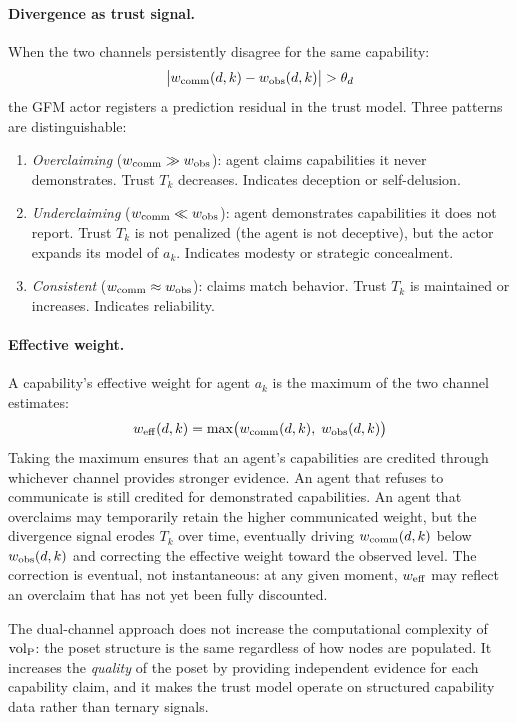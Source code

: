 \paragraph{Divergence as trust signal.} When the two channels persistently
disagree for the same capability:
\begin{equation}
\label{eq:divergence}
\bigl|w_{\mathrm{comm}}(d, k) - w_{\mathrm{obs}}(d, k)\bigr| > \theta_d
\end{equation}
the GFM actor registers a prediction residual in the trust model. Three
patterns are distinguishable:

\begin{enumerate}
\item \emph{Overclaiming} ($w_{\mathrm{comm}} \gg w_{\mathrm{obs}}$): agent claims capabilities it
  never demonstrates. Trust $T_k$ decreases. Indicates deception or
  self-delusion.
\item \emph{Underclaiming} ($w_{\mathrm{comm}} \ll w_{\mathrm{obs}}$): agent demonstrates
  capabilities it does not report. Trust $T_k$ is not penalized (the agent is
  not deceptive), but the actor expands its model of $a_k$. Indicates modesty
  or strategic concealment.
\item \emph{Consistent} ($w_{\mathrm{comm}} \approx w_{\mathrm{obs}}$): claims match behavior.
  Trust $T_k$ is maintained or increases. Indicates reliability.
\end{enumerate}

\paragraph{Effective weight.} A capability's effective weight for agent $a_k$
is the maximum of the two channel estimates:
\begin{equation}
\label{eq:w_eff}
w_{\mathrm{eff}}(d, k) = \max\bigl(w_{\mathrm{comm}}(d, k),\; w_{\mathrm{obs}}(d, k)\bigr)
\end{equation}
Taking the maximum ensures that an agent's capabilities are credited through
whichever channel provides stronger evidence. An agent that refuses to
communicate is still credited for demonstrated capabilities. An agent that
overclaims may temporarily retain the higher communicated weight, but the
divergence signal erodes $T_k$ over time, eventually driving $w_{\mathrm{comm}}(d, k)$
below $w_{\mathrm{obs}}(d, k)$ and correcting the effective weight toward the observed
level. The correction is eventual, not instantaneous: at any given moment,
$w_{\mathrm{eff}}$ may reflect an overclaim that has not yet been fully discounted.

The dual-channel approach does not increase the computational complexity of
${\operatorname{vol}_{\mathrm{P}}}$: the poset structure is the same regardless of how nodes are
populated. It increases the \emph{quality} of the poset by providing
independent evidence for each capability claim, and it makes the trust model
operate on structured capability data rather than ternary signals.
